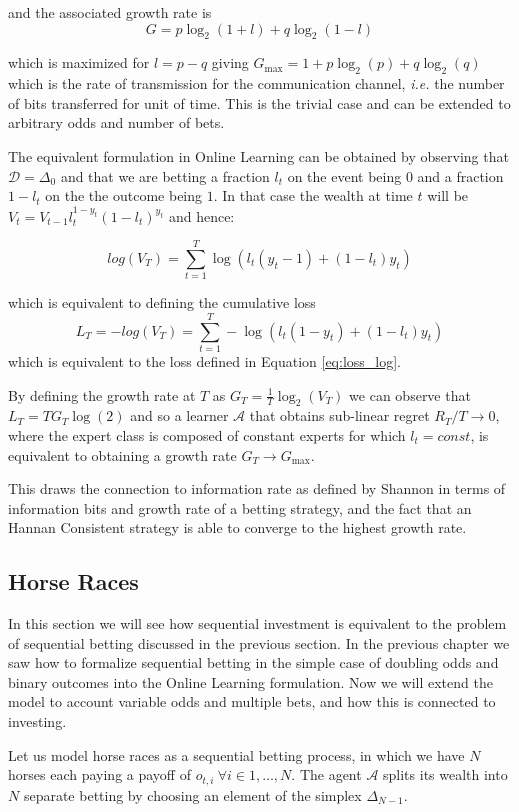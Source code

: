 and the associated growth rate is 
$$G=p\log_2(1+l)+q\log_2(1-l)$$

which is maximized for $l=p-q$ giving $G_{\max}=1+p\log_2(p)+q\log_2(q)$ which is the rate of transmission for the communication channel, \emph{i.e.} the number of bits transferred for unit of time. This is the trivial case and can be extended to arbitrary odds and number of bets.

The equivalent formulation in Online Learning can be obtained by observing that $\mathcal D=\Delta_0$ and that we are betting a fraction $l_t$ on the event being $0$ and a fraction $1-l_t$ on the the outcome being $1$. In that case the wealth at time $t$ will be $V_t=V_{t-1}l_t^{1-y_t}(1-l_t)^{y_t}$ and hence: 

\begin{equation}
log(V_T)=\sum\limits_{t=1}^T\log(l_t(y_t-1)+(1-l_t)y_t)
\end{equation}

which is equivalent to defining the cumulative loss 
$$L_T=-log(V_T)=\sum\limits_{t=1}^T-\log(l_t(1-y_t)+(1-l_t)y_t)$$
which is equivalent to the loss defined in Equation \eqref{eq:loss_log}.

By defining the growth rate at $T$ as $G_T=\frac{1}{T}\log_2(V_T)$ we can observe that $L_T=TG_T\log(2)$ and so a learner $\mathcal A$ that obtains sub-linear regret $R_T/T\to0$, where the expert class is composed of constant experts for which $l_t=const$, is equivalent to obtaining a growth rate $G_T\to G_{\max}$.

This draws the connection to information rate as defined by Shannon in terms of information bits and growth rate of a betting strategy, and the fact that an Hannan Consistent strategy is able to converge to the highest growth rate. 

\subsection{Horse Races}

In this section we will see how sequential investment is equivalent to the problem of sequential betting discussed in the previous section.
In the previous chapter we saw how to formalize sequential betting in the simple case of doubling odds and binary outcomes into the Online Learning formulation. Now we will extend the model to account variable odds and multiple bets, and how this is connected to investing.

Let us model horse races as a sequential betting process, in which we have $N$ horses each paying a payoff of $o_{t,i}\ \forall i\in 1,\ldots,N$. The agent $\mathcal A$ splits its wealth into $N$ separate betting by choosing an element of the simplex $\Delta_{N-1}$.

